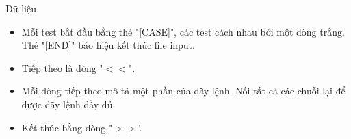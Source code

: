 Dữ liệu  
\begin{itemize}
	\item     Mỗi test bắt đầu bằng thẻ "[CASE]", các test cách nhau bởi một dòng trắng. Thẻ "[END]" báo hiệu kết thúc file input.   
	\item     Tiếp theo là dòng "$<$$<$".   
	\item     Mỗi dòng tiếp theo mô tả một phần của dãy lệnh. Nối tất cả các chuỗi lại để được dãy lệnh đầy đủ.   
	\item     Kết thúc bằng dòng "$>$$>$'.   
\end{itemize}
